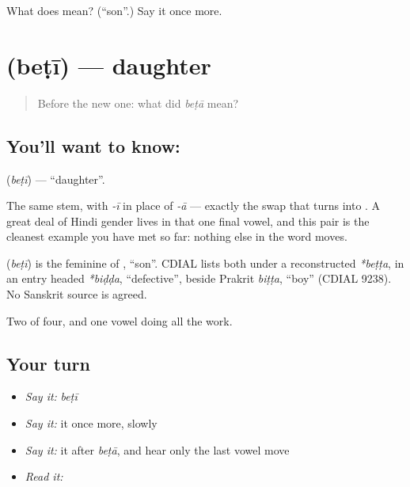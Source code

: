 \begin{tcolorbox}[breakable,colback=teal!4,colframe=teal!35!black,title={Before you move on}]
What does  mean? (\textquotedblleft{}son\textquotedblright{}.) Say it once more.
\end{tcolorbox}
\section[\texorpdfstring{\hi{बेटी} (beṭī)}{बेटी (beṭī)}]{ (beṭī) — daughter}

\label{lesson:HI-C44-daughter}



\begin{quote}
Before the new one: what did \emph{beṭā} mean?
\end{quote}

\subsection*{You'll want to know: }
\textbf{} (\emph{beṭī}) — \textquotedblleft{}daughter\textquotedblright{}.

The same stem, with \emph{-ī} in place of \emph{-ā} — exactly the swap that turns  into . A great deal of Hindi gender lives in that one final vowel, and this pair is the cleanest example you have met so far: nothing else in the word moves.

\begin{cousinweb}
\textbf{} (\emph{beṭī}) is the feminine of \textbf{}, \textquotedblleft{}son\textquotedblright{}. CDIAL lists both under a reconstructed \emph{*beṭṭa}, in an entry headed \emph{*biḍḍa}, \textquotedblleft{}defective\textquotedblright{}, beside Prakrit \emph{biṭṭa}, \textquotedblleft{}boy\textquotedblright{} (CDIAL 9238). No Sanskrit source is agreed.
\end{cousinweb}

\begin{grammarlens}[title={What you've built}]
Two of four, and one vowel doing all the work.
\end{grammarlens}

\subsection*{Your turn}
\begin{itemize}
\raggedright
  \item \emph{Say it:} \emph{beṭī}
  \item \emph{Say it:} it once more, slowly
  \item \emph{Say it:} it after \emph{beṭā}, and hear only the last vowel move
  \item \emph{Read it:} \textbf{}
\end{itemize}

